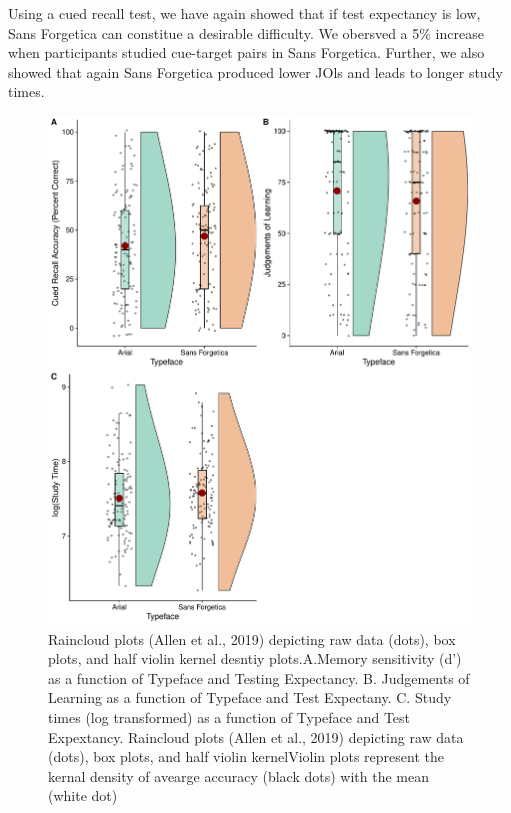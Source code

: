\documentclass[
  english,
  jou]{apa6}
\begin{document}
Using a cued recall test, we have again showed that if test expectancy is low, Sans Forgetica can constitue a desirable difficulty. We obersved a 5\% increase when participants studied cue-target pairs in Sans Forgetica. Further, we also showed that again Sans Forgetica produced lower JOls and leads to longer study times.

\begin{figure}

{\centering \includegraphics{Testing_Expectancy_SF_files/figure-latex/unnamed-chunk-20-1} 

}

\caption{Raincloud plots (Allen et al., 2019) depicting raw data (dots), box plots, and half violin kernel desntiy plots.A.Memory sensitivity (d') as a function of Typeface and Testing Expectancy. B. Judgements of Learning as a function of Typeface and Test Expectany. C. Study times (log transformed) as a function of Typeface and Test Expextancy. Raincloud plots (Allen et al., 2019) depicting raw data (dots), box plots, and half violin kernelViolin plots represent the kernal density of avearge accuracy (black dots) with the mean (white dot)}\label{fig:unnamed-chunk-20}
\end{figure}
\end{document}
